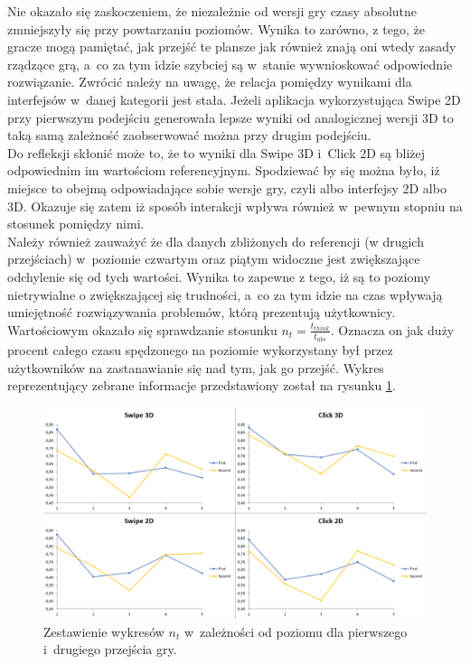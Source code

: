 \documentclass[a4paper,12pt,numbers=noenddot]{report}
\begin{document}
Nie okazało się zaskoczeniem, że niezależnie od wersji gry czasy absolutne zmniejszyły się przy powtarzaniu poziomów. Wynika to zarówno, z tego, że gracze mogą pamiętać, jak przejść te plansze jak również znają oni wtedy zasady rządzące grą, a~co za tym idzie szybciej są w~stanie wywnioskować odpowiednie rozwiązanie. Zwrócić należy na uwagę, że relacja pomiędzy wynikami dla interfejsów w~danej kategorii jest stała. Jeżeli aplikacja wykorzystująca Swipe 2D przy pierwszym podejściu generowała lepsze wyniki od analogicznej wersji 3D to taką samą zależność zaobserwować można przy drugim podejściu.\\
Do refleksji skłonić może to, że to wyniki dla Swipe 3D i~Click 2D są bliżej odpowiednim im wartościom referencyjnym. Spodziewać by się można było, iż miejsce to obejmą odpowiadające sobie wersje gry, czyli albo interfejsy 2D albo 3D. Okazuje się zatem iż sposób interakcji wpływa również w~pewnym stopniu na stosunek pomiędzy nimi. \\
Należy również zauważyć że dla danych zbliżonych do referencji (w drugich przejściach) w~poziomie czwartym oraz piątym widoczne jest zwiększające odchylenie się od tych wartości. Wynika to zapewne z tego, iż są to poziomy nietrywialne o zwiększającej się trudności, a~co za tym idzie na czas wpływają umiejętność rozwiązywania problemów, którą prezentują użytkownicy.\\

Wartościowym okazało się sprawdzanie stosunku $n_{t} = \frac{t_{think}}{t_{abs}}$. Oznacza on jak duży procent całego czasu spędzonego na poziomie wykorzystany był przez użytkowników na zastanawianie się nad tym, jak go przejść. Wykres reprezentujący zebrane informacje przedstawiony został na rysunku \ref{fig:diag:ref:tThink_tAbs}.

\begin{figure}[h!]
	\centering
  	\includegraphics[width=\linewidth]{diag/ref_tThink_tAbs.png}
	\caption{Zestawienie wykresów $n_{t}$ w~zależności od poziomu dla pierwszego i~drugiego przejścia gry.}
	\label{fig:diag:ref:tThink_tAbs}
\end{figure}
\end{document}
